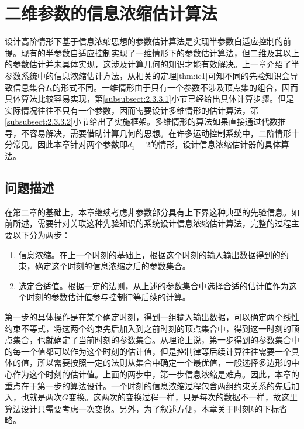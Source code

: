 \chapter{二维参数的信息浓缩估计算法}\label{chap:3}
设计高阶情形下基于信息浓缩思想的参数估计算法是实现半参数自适应控制的前提。现有的半参数自适应控制实现了一维情形下的参数估计算法，但二维及其以上的参数估计并未具体实现，这涉及计算几何的知识才能有效解决。上一章介绍了半参数系统中的信息浓缩估计方法，从相关的定理\ref{thm:ic1}可知不同的先验知识会导致信息集合$I_{k}$的形式不同。一维情形由于只有一个参数不涉及顶点集的组合，因而具体算法比较容易实现，第\ref{subsubsect:2.3.3.1}小节已经给出具体计算步骤。但是实际情况往往不只有一个参数，因而需要设计多维情形的估计算法，第\ref{subsubsect:2.3.3.2}小节给出了实施框架。多维情形的算法如果直接通过代数推导，不容易解决，需要借助计算几何的思想。在许多运动控制系统中，二阶情形十分常见。因此本章针对两个参数即$d_{1}=2$的情形，设计信息浓缩估计器的具体算法。
\section{问题描述}\label{sect:3.1}
在第二章的基础上，本章继续考虑非参数部分具有上下界这种典型的先验信息。如前所述，需要针对关联这种先验知识的系统设计信息浓缩估计算法，完整的过程主要以下分为两步：
\begin{enumerate}
\item 信息浓缩。在上一个时刻的基础上，根据这个时刻的输入输出数据得到的约束，确定这个时刻的信息浓缩之后的参数集合。
\item 选定合适值。根据一定的法则，从上述的参数集合中选择合适的估计值作为这个时刻的参数估计值参与控制律等后续的计算。
\end{enumerate}

第一步的具体操作是在某个确定时刻，得到一组输入输出数据，可以确定两个线性约束不等式，将这两个约束先后加入到之前时刻的顶点集合中，得到这一时刻的顶点集合，也就确定了当前时刻的参数集合。从理论上说，第一步得到的参数集合中的每一个值都可以作为这个时刻的估计值，但是控制律等后续计算往往需要一个具体的值，所以需要按照一定的法则从集合中确定一个最优值，一般选择多边形的中心作为这个时刻的估计值。上面的两步中，第一步信息浓缩是难点。因此，本章的重点在于第一步的算法设计。一个时刻的信息浓缩过程包含两组约束关系的先后加入，也就是两次$G$变换。这两次的变换过程一样，只是每次的数据不一样，故这里算法设计只需要考虑一次变换。另外，为了叙述方便，本章关于时刻$k$的下标省略。

